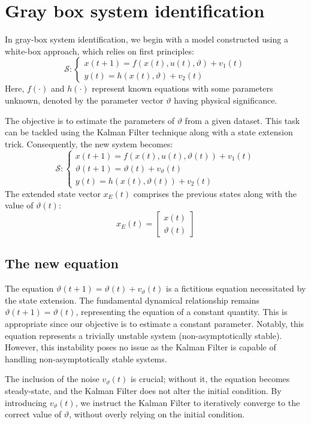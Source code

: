 \section{Gray box system identification}

In gray-box system identification, we begin with a model constructed using a white-box approach, which relies on first principles:
\[\mathcal{S}:\begin{cases}
    x(t+1)=f(x(t),u(t),\vartheta)+v_1(t) \\
    y(t)=h(x(t),\vartheta)+v_2(t)
\end{cases}\]
Here, $f(\cdot)$ and $h(\cdot)$ represent known equations with some parameters unknown, denoted by the parameter vector $\vartheta$ having physical significance.

The objective is to estimate the parameters of $\vartheta$ from a given dataset. This task can be tackled using the Kalman Filter technique along with a state extension trick. 
Consequently, the new system becomes:
\[\mathcal{S}:\begin{cases}
    x(t+1)=f(x(t),u(t),\vartheta(t))+v_1(t) \\
    \vartheta(t+1)=\vartheta(t)+v_{\vartheta}(t) \\
    y(t)=h(x(t),\vartheta(t))+v_2(t)
\end{cases}\]
The extended state vector $x_E(t)$ comprises the previous states along with the value of $\vartheta(t)$: 
\[x_E(t)=\begin{bmatrix} x(t) \\ \vartheta(t) \end{bmatrix}\]

\subsection{The new equation} 
The equation $\vartheta(t+1)=\vartheta(t)+v_{\vartheta}(t)$ is a fictitious equation necessitated by the state extension.
The fundamental dynamical relationship remains $\vartheta(t+1)=\vartheta(t)$, representing the equation of a constant quantity.
This is appropriate since our objective is to estimate a constant parameter.
Notably, this equation represents a trivially unstable system (non-asymptotically stable). 
However, this instability poses no issue as the Kalman Filter is capable of handling non-asymptotically stable systems.

The inclusion of the noise $v_{\vartheta}(t)$ is crucial; without it, the equation becomes steady-state, and the Kalman Filter does not alter the initial condition.
By introducing $v_{\vartheta}(t)$, we instruct the Kalman Filter to iteratively converge to the correct value of $\vartheta$, without overly relying on the initial condition.

